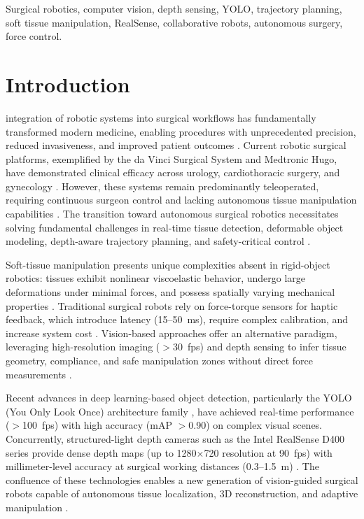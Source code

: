 \documentclass[journal]{IEEEtran}
\begin{document}
\begin{IEEEkeywords}
Surgical robotics, computer vision, depth sensing, YOLO, trajectory planning, soft tissue manipulation, RealSense, collaborative robots, autonomous surgery, force control.
\end{IEEEkeywords}

\section{Introduction}
 integration of robotic systems into surgical workflows has fundamentally transformed modern medicine, enabling procedures with unprecedented precision, reduced invasiveness, and improved patient outcomes \cite{taylor2016medical, intuitive2023davinci}. Current robotic surgical platforms, exemplified by the da Vinci Surgical System and Medtronic Hugo, have demonstrated clinical efficacy across urology, cardiothoracic surgery, and gynecology \cite{lanfranco2004robotic}. However, these systems remain predominantly teleoperated, requiring continuous surgeon control and lacking autonomous tissue manipulation capabilities \cite{shademan2016supervised}. The transition toward autonomous surgical robotics necessitates solving fundamental challenges in real-time tissue detection, deformable object modeling, depth-aware trajectory planning, and safety-critical control \cite{yang2017medical}.

Soft-tissue manipulation presents unique complexities absent in rigid-object robotics: tissues exhibit nonlinear viscoelastic behavior, undergo large deformations under minimal forces, and possess spatially varying mechanical properties \cite{misra2010modeling}. Traditional surgical robots rely on force-torque sensors for haptic feedback, which introduce latency (15--50~ms), require complex calibration, and increase system cost \cite{okamura2004haptic}. Vision-based approaches offer an alternative paradigm, leveraging high-resolution imaging ($>$30~fps) and depth sensing to infer tissue geometry, compliance, and safe manipulation zones without direct force measurements \cite{pratt2010autonomous}.

Recent advances in deep learning-based object detection, particularly the YOLO (You Only Look Once) architecture family \cite{redmon2016you, bochkovskiy2020yolov4, ultralytics2023yolov8}, have achieved real-time performance ($>$100~fps) with high accuracy (mAP $>$0.90) on complex visual scenes. Concurrently, structured-light depth cameras such as the Intel RealSense D400 series provide dense depth maps (up to 1280$\times$720 resolution at 90~fps) with millimeter-level accuracy at surgical working distances (0.3--1.5~m) \cite{intel2023realsense}. The confluence of these technologies enables a new generation of vision-guided surgical robots capable of autonomous tissue localization, 3D reconstruction, and adaptive manipulation \cite{yang2020vision}.
\end{document}
